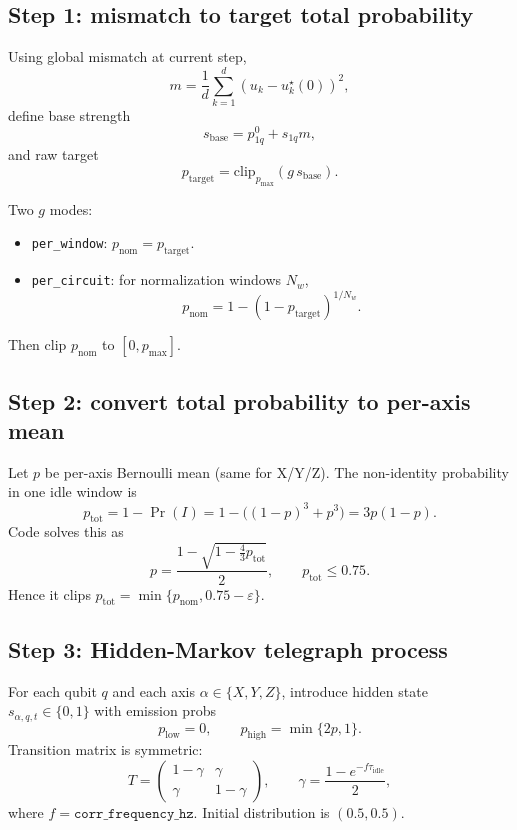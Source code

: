 \documentclass[11pt]{article}
\begin{document}
\subsection{Step 1: mismatch to target total probability}
Using global mismatch at current step,
\begin{equation}
m=\frac{1}{d}\sum_{k=1}^{d}(u_k-u_k^\star(0))^2,
\end{equation}
define base strength
\begin{equation}
s_{\mathrm{base}}=p_{1q}^{0}+s_{1q}m,
\end{equation}
and raw target
\begin{equation}
p_{\mathrm{target}}=\mathrm{clip}_{p_{\max}}(g\,s_{\mathrm{base}}).
\label{eq:corr_target}
\end{equation}

Two $g$ modes:
\begin{itemize}
\item \texttt{per\_window}: $p_{\mathrm{nom}}=p_{\mathrm{target}}$.
\item \texttt{per\_circuit}: for normalization windows $N_w$,
\begin{equation}
p_{\mathrm{nom}}=1-(1-p_{\mathrm{target}})^{1/N_w}.
\label{eq:per_circuit_norm}
\end{equation}
\end{itemize}
Then clip $p_{\mathrm{nom}}$ to $[0,p_{\max}]$.

\subsection{Step 2: convert total probability to per-axis mean}
Let $p$ be per-axis Bernoulli mean (same for X/Y/Z).
The non-identity probability in one idle window is
\begin{equation}
p_{\mathrm{tot}} = 1-\Pr(I)=1-\bigl((1-p)^3+p^3\bigr)=3p(1-p).
\label{eq:tot_to_axis}
\end{equation}
Code solves this as
\begin{equation}
p=\frac{1-\sqrt{1-\frac{4}{3}p_{\mathrm{tot}}}}{2},
\qquad
p_{\mathrm{tot}}\le 0.75.
\end{equation}
Hence it clips
$p_{\mathrm{tot}}=\min\{p_{\mathrm{nom}},0.75-\varepsilon\}$.

\subsection{Step 3: Hidden-Markov telegraph process}
For each qubit $q$ and each axis $\alpha\in\{X,Y,Z\}$,
introduce hidden state $s_{\alpha,q,t}\in\{0,1\}$ with emission probs
\begin{equation}
p_{\mathrm{low}}=0,
\qquad
p_{\mathrm{high}}=\min\{2p,1\}.
\end{equation}
Transition matrix is symmetric:
\begin{equation}
T=
\begin{pmatrix}
1-\gamma & \gamma\\
\gamma & 1-\gamma
\end{pmatrix},
\qquad
\gamma=\frac{1-e^{-f\tau_{\mathrm{idle}}}}{2},
\label{eq:corr_transition}
\end{equation}
where $f=\texttt{corr\_frequency\_hz}$.
Initial distribution is $(0.5,0.5)$.
\end{document}
